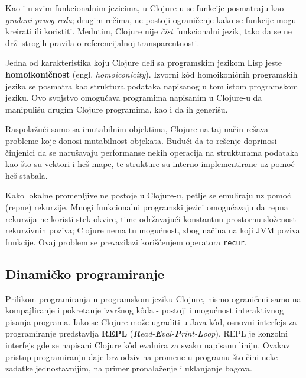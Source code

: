 Kao i u svim funkcionalnim jezicima, u Clojure-u se funkcije posmatraju kao \emph{građani prvog reda}; drugim rečima, ne postoji ograničenje kako se funkcije mogu kreirati ili koristiti. Međutim, Clojure nije \emph{čist} funkcionalni jezik, tako da se ne drži strogih pravila o referencijalnoj transparentnosti\cite{transparency_2}\cite{transparency}.

Jedna od karakteristika koju Clojure deli sa programskim jezikom Lisp jeste \textbf{homoikoničnost} (engl. \textit{homoiconicity}). Izvorni kôd homoikoničnih programskih jezika se posmatra kao struktura podataka napisanog u tom istom programskom jeziku. Ovo svojstvo omogućava programima napisanim u Clojure-u da manipulišu drugim Clojure programima, kao i da ih generišu.

Raspolažući samo sa imutabilnim objektima, Clojure na taj način rešava probleme koje donosi mutabilnost objekata. Budući da to rešenje doprinosi činjenici da se narušavaju performanse nekih operacija na strukturama podataka kao što su vektori i heš mape, te strukture su interno implementirane uz pomoć heš stabala.

Kako lokalne promenljive ne postoje u Clojure-u, petlje se emuliraju uz pomoć (repne) rekurzije. Mnogi funkcionalni programski jezici omogućavaju da repna rekurzija ne koristi stek okvire, time održavajući konstantnu prostornu složenost rekurzivnih poziva; Clojure nema tu mogućnost, zbog načina na koji JVM poziva funkcije. Ovaj problem se prevazilazi korišćenjem operatora \texttt{recur}\cite{livingclojure}.

\subsection{Dinamičko programiranje}
\label{subsec:dinamickoprogramiranje}

Prilikom programiranja u programskom jeziku Clojure, nismo ograničeni samo na kompajliranje i pokretanje izvršnog kôda - postoji i mogućnost interaktivnog pisanja programa.
Iako se Clojure može ugraditi u Java kôd, osnovni interfejs za programiranje predstavlja \textbf{REPL} (\textit{\textbf{R}ead-\textbf{E}val-\textbf{P}rint-\textbf{L}oop}). REPL je konzolni interfejs gde se napisani Clojure kôd evaluira za svaku napisanu liniju. Ovakav pristup programiranju daje brz odziv na promene u programu što čini neke zadatke jednostavnijim, na primer pronalaženje i uklanjanje bagova. 